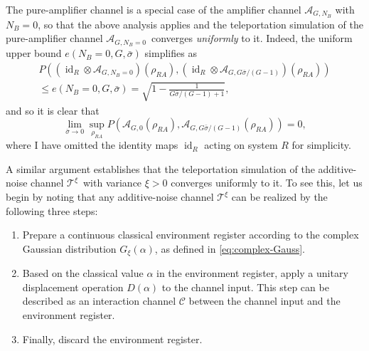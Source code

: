 \documentclass[apsrev,twocolumn]{revtex4-1}%
\begin{document}
The pure-amplifier channel is a special case of the amplifier channel
$\mathcal{A}_{G,N_{B}}$ with $N_{B}=0$, so that the above analysis applies and
the teleportation simulation of the pure-amplifier channel $\mathcal{A}%
_{G,N_{B}=0}$\ converges \textit{uniformly} to it. Indeed, the uniform upper
bound $e(N_{B}=0,G,\bar{\sigma})$ simplifies as%
\begin{multline}
P((\operatorname{id}_{R}\otimes\mathcal{A}_{G,N_{B}=0})(\rho_{RA}%
),(\operatorname{id}_{R}\otimes\mathcal{A}_{G,G\bar{\sigma}/(G-1)})(\rho
_{RA}))\\
\leq e(N_{B}=0,G,\bar{\sigma})=\sqrt{1-\frac{1}{G\bar{\sigma}/(G-1)+1}},
\end{multline}
and so it is clear that%
\begin{equation}
\lim_{\bar{\sigma}\rightarrow0}\sup_{\rho_{RA}}P(\mathcal{A}_{G,0}(\rho
_{RA}),\mathcal{A}_{G,G\bar{\sigma}/(G-1)}(\rho_{RA}))=0,
\end{equation}
where I have omitted the identity maps $\operatorname{id}_{R}$ acting on
system $R$ for simplicity.

A similar argument establishes that the teleportation simulation of the
additive-noise channel $\mathcal{T}^{\xi}$\ with variance $\xi>0$ converges
uniformly to it. To see this, let us begin by noting that any additive-noise
channel $\mathcal{T}^{\xi}$ can be realized by the following three steps:

\begin{enumerate}
\item Prepare a continuous classical environment register according to the
complex Gaussian distribution $G_{\xi}(\alpha)$, as defined in \eqref{eq:complex-Gauss}.

\item Based on the classical value $\alpha$ in the environment register, apply
a unitary displacement operation $D(\alpha)$ to the channel input. This step
can be described as an interaction channel $\mathcal{C}$ between the channel
input and the environment register.

\item Finally, discard the environment register.
\end{enumerate}
\end{document}
